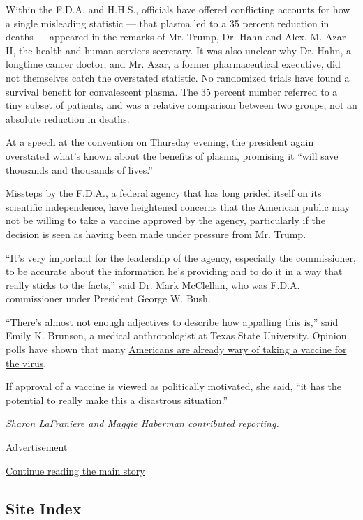 Within the F.D.A. and H.H.S., officials have offered conflicting
accounts for how a single misleading statistic --- that plasma led to a
35 percent reduction in deaths --- appeared in the remarks of Mr. Trump,
Dr. Hahn and Alex. M. Azar II, the health and human services secretary.
It was also unclear why Dr. Hahn, a longtime cancer doctor, and Mr.
Azar, a former pharmaceutical executive, did not themselves catch the
overstated statistic. No randomized trials have found a survival benefit
for convalescent plasma. The 35 percent number referred to a tiny subset
of patients, and was a relative comparison between two groups, not an
absolute reduction in deaths.

At a speech at the convention on Thursday evening, the president again
overstated what's known about the benefits of plasma, promising it
``will save thousands and thousands of lives.''

Missteps by the F.D.A., a federal agency that has long prided itself on
its scientific independence, have heightened concerns that the American
public may not be willing to
\href{https://www.nytimes3xbfgragh.onion/interactive/2020/science/coronavirus-vaccine-tracker.html}{take
a vaccine} approved by the agency, particularly if the decision is seen
as having been made under pressure from Mr. Trump.

``It's very important for the leadership of the agency, especially the
commissioner, to be accurate about the information he's providing and to
do it in a way that really sticks to the facts,'' said Dr. Mark
McClellan, who was F.D.A. commissioner under President George W. Bush.

``There's almost not enough adjectives to describe how appalling this
is,'' said Emily K. Brunson, a medical anthropologist at Texas State
University. Opinion polls have shown that many
\href{https://www.nytimes3xbfgragh.onion/2020/07/18/health/coronavirus-anti-vaccine.html}{Americans
are already wary of taking a vaccine for the virus}.

If approval of a vaccine is viewed as politically motivated, she said,
``it has the potential to really make this a disastrous situation.''

\emph{Sharon LaFraniere and Maggie Haberman contributed reporting.}

Advertisement

\protect\hyperlink{after-bottom}{Continue reading the main story}

\hypertarget{site-index}{%
\subsection{Site Index}\label{site-index}}

